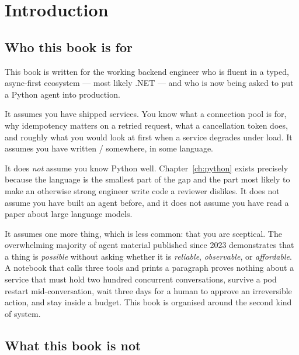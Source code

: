 \chapter*{Introduction}

\section*{Who this book is for}

This book is written for the working backend engineer who is fluent in a typed,
async-first ecosystem --- most likely .NET --- and who is now being asked to put
a Python agent into production.

It assumes you have shipped services. You know what a connection pool is for,
why idempotency matters on a retried request, what a cancellation token does,
and roughly what you would look at first when a service degrades under load. It
assumes you have written / somewhere, in some language.

It does \emph{not} assume you know Python well. Chapter~\ref{ch:python} exists
precisely because the language is the smallest part of the gap and the part most
likely to make an otherwise strong engineer write code a reviewer dislikes.
It does not assume you have built an agent before, and it does not assume you
have read a paper about large language models.

It assumes one more thing, which is less common: that you are sceptical. The
overwhelming majority of agent material published since 2023 demonstrates that a
thing is \emph{possible} without asking whether it is \emph{reliable},
\emph{observable}, or \emph{affordable}. A notebook that calls three tools and
prints a paragraph proves nothing about a service that must hold two hundred
concurrent conversations, survive a pod restart mid-conversation, wait three days
for a human to approve an irreversible action, and stay inside a budget. This
book is organised around the second kind of system.

\section*{What this book is not}

